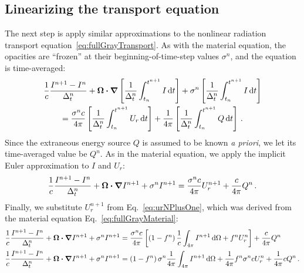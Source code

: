 \subsection{Linearizing the transport equation}
The next step is apply similar approximations to the nonlinear radiation
transport equation~\eqref{eq:fullGrayTransport}. As with the material equation,
the
opacities are ``frozen'' at their beginning-of-time-step values $\sigma^n$, and
the equation is time-averaged:
\begin{multline*}
  \frac{1}{c} \frac{I^{n+1} - I^n}{\Delta_t^n}
  + \bm{\Omega} \bm{\cdot} \bm{\nabla} \left[
  \frac{1}{\Delta_t^n}\int_{t_n}^{t^{n+1}} I\mathop{}\!\mathrm{d} t
  \right] +
 \sigma^n \left[
  \frac{1}{\Delta_t^n}\int_{t_n}^{t^{n+1}} I\mathop{}\!\mathrm{d} t
  \right]
  \\
  = \frac{\sigma^n c}{4\pi} \left[
  \frac{1}{\Delta_t^n}\int_{t_n}^{t^{n+1}} U_r \mathop{}\!\mathrm{d} t \right]
  + \frac{1}{4\pi}\left[
  \frac{1}{\Delta_t^n}\int_{t_n}^{t^{n+1}} Q \mathop{}\!\mathrm{d} t \right] \,.
\end{multline*}
Since the extraneous energy source $Q$ is assumed to be known \emph{a priori},
we let its time-averaged value be $Q^n$. As in the material equation, we apply
the implicit Euler approximation to $I$ and $U_r$:
\begin{equation*}
  \frac{1}{c} \frac{I^{n+1} - I^n}{\Delta_t^n}
  + \bm{\Omega} \bm{\cdot} \bm{\nabla} I^{n+1}
 + \sigma^n I^{n+1}
 = \frac{\sigma^n c}{4\pi} U_r^{n+1}
  + \frac{c}{4\pi} Q^n \,.
\end{equation*}
Finally, we substitute $U_r^{n+1}$ from Eq.~\eqref{eq:urNPlusOne},
which was derived from the material equation Eq.~\eqref{eq:fullGrayMaterial}:
\begin{align}\nonumber
  \frac{1}{c} \frac{I^{n+1} - I^n}{\Delta_t^n}
  + \bm{\Omega} \bm{\cdot} \bm{\nabla} I^{n+1}
 + \sigma^n I^{n+1}
 &= \frac{\sigma^n c}{4\pi} \left[ \left(1 - f^n\right) \frac1c \int_{4\pi} I^{n+1}\mathop{}\!\mathrm{d} \Omega + f^n U_r^n \right]
  + \frac{c}{4\pi} Q^n
  \\ \label{eq:linearizedGrayTransport}
  \frac{1}{c} \frac{I^{n+1} - I^n}{\Delta_t^n}
  + \bm{\Omega} \bm{\cdot} \bm{\nabla} I^{n+1}
 + \sigma^n I^{n+1}
 &=  \left(1 - f^n\right) \sigma^n \frac{1}{4\pi} \int_{4\pi} I^{n+1}\mathop{}\!\mathrm{d} \Omega
 + \frac{1}{4\pi} f^n \sigma^n c U_r^n
  + \frac{1}{4\pi} c Q^n \,.
\end{align}

